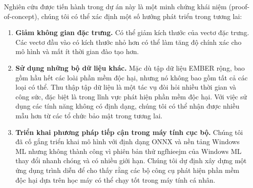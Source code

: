 Nghiên cứu được tiến hành trong dự án này là một minh chứng khái niệm (proof-of-concept), chúng tôi có thể xác định một số hướng phát triển trong tương lai:

\begin{enumerate}
    \item \textbf{Giảm không gian đặc trưng. } Có thể giảm kích thước của vectơ đặc trưng. Các vectơ đầu vào có kích thước nhỏ hơn có thể làm tăng độ chính xác cho mô hình và mất ít thời gian đào tạo hơn.
    \item \textbf{Sử dụng những bộ dữ liệu khác. } 
    Mặc dù tập dữ liệu EMBER rộng, bao gồm hầu hết các loài phần mềm độc hại, nhưng nó không bao gồm tất cả các loại có thể. Thu thập tập dữ liệu là một tác vụ đòi hỏi nhiều thời gian và công sức, đặc biệt là trong lĩnh vực phát hiện phần mềm độc hại. Với việc sử dụng các tính năng không có định dạng, chúng tôi có thể nhận được nhiều mẫu hơn từ các tổ chức bảo mật trong tương lai.
    \item \textbf{Triển khai phương pháp tiếp cận trong máy tính cục bộ. } Chúng tôi đã cố gắng triển khai mô hình với định dạng ONNX và nền tảng Windows ML nhưng không thành công vì phiên bản thử ngfhieejm của Windows ML thay đổi nhanh chóng và có nhiều giới hạn. Chúng tôi dự định xây dựng một ứng dụng trình diễn để cho thấy rằng các bộ công cụ phát hiện phần mềm độc hại dựa trên học máy có thể chạy tốt trong máy tính cá nhân.
\end{enumerate}

